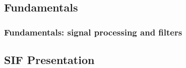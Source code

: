 \subsection{Fundamentals}
\begin{frame}
	\frametitle{Fundamentals: signal processing and filters}

	
\end{frame}

\subsection{SIF Presentation}
